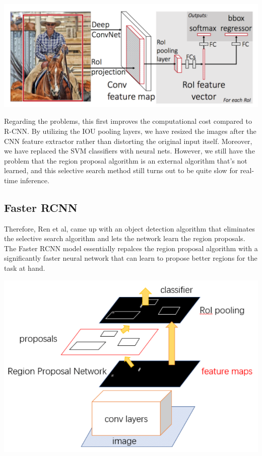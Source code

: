   \begin{center}
      \includegraphics[scale=0.3]{img/fast_rcnn.png}
  \end{center}

  Regarding the problems, this first improves the computational cost compared to R-CNN. By utilizing the IOU pooling layers, we have resized the images after the CNN feature extractor rather than distorting the original input itself. Moreover, we have replaced the SVM classifiers with neural nets. However, we still have the problem that the region proposal algorithm is an external algorithm that's not learned, and this selective search method still turns out to be quite slow for real-time inference.  

\subsection{Faster RCNN}

  Therefore, Ren et al, came up with an object detection algorithm that eliminates the selective search algorithm and lets the network learn the region proposals. The Faster RCNN model essentially repalces the region proposal algorithm with a significantly faster neural network that can learn to propose better regions for the task at hand. 
  \begin{center}
      \includegraphics[scale=0.4]{img/faster_rcnn_diagram.png}
  \end{center}

